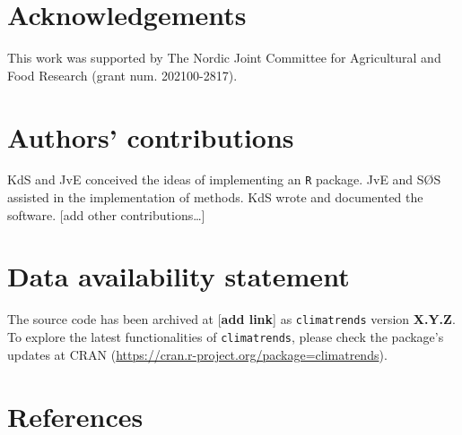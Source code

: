 \documentclass[
]{article}
\begin{document}
\hypertarget{acknowledgements}{%
\section{Acknowledgements}\label{acknowledgements}}

This work was supported by The Nordic Joint Committee for Agricultural
and Food Research (grant num. 202100-2817).

\hypertarget{authors-contributions}{%
\section{Authors' contributions}\label{authors-contributions}}

KdS and JvE conceived the ideas of implementing an \texttt{R} package.
JvE and SØS assisted in the implementation of methods. KdS wrote and
documented the software. {[}add other contributions\ldots{]}

\hypertarget{data-availability-statement}{%
\section{Data availability
statement}\label{data-availability-statement}}

The source code has been archived at {[}\textbf{add link}{]} as
\texttt{climatrends} version \textbf{X.Y.Z}. To explore the latest
functionalities of \texttt{climatrends}, please check the package's
updates at CRAN (\url{https://cran.r-project.org/package=climatrends}).

\hypertarget{references}{%
\section{References}\label{references}}
\end{document}

